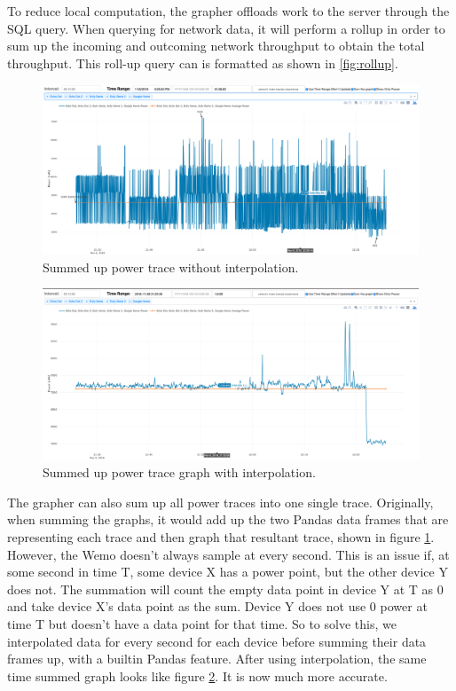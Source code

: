 To reduce local computation, the grapher offloads work to the server through the SQL query. When querying for network data, it will perform a rollup in order to sum up the incoming and outcoming network throughput to obtain the total throughput. This roll-up query can is formatted as shown in \ref{fig:rollup}.

\begin{figure}[H]
    \centering
    \includegraphics[width=1\textwidth]{figures/noninterpolated.png}
    \caption{Summed up power trace without interpolation.}
    \label{fig:noninterpolated}
\end{figure}

\begin{figure}[H]
    \centering
    \includegraphics[width=1\textwidth]{figures/interpolated.png}
    \caption{Summed up power trace graph with interpolation.}
    \label{fig:interpolated}
\end{figure}

The grapher can also sum up all power traces into one single trace. Originally, when summing the graphs, it would add up the two Pandas data frames that are representing each trace and then graph that resultant trace, shown in figure \ref{fig:noninterpolated}. However, the Wemo doesn't always sample at every second. This is an issue if, at some second in time T, some device X has a power point, but the other device Y does not. The summation will count the empty data point in device Y at T as 0 and take device X's data point as the sum. Device Y does not use 0 power at time T but doesn't have a data point for that time. So to solve this, we interpolated data for every second for each device before summing their data frames up, with a builtin Pandas feature. After using interpolation, the same time summed graph looks like figure \ref{fig:interpolated}. It is now much more accurate.

